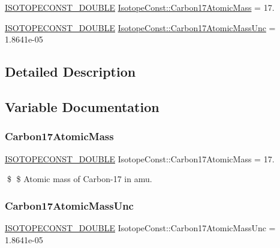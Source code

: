 \begin{DoxyCompactItemize}
\item 
\mbox{\hyperlink{group___isotope_const-_macros_ga8f45a7272ce02c0b4c65c44636ed719a}{I\+S\+O\+T\+O\+P\+E\+C\+O\+N\+S\+T\+\_\+\+D\+O\+U\+B\+LE}} \mbox{\hyperlink{group___isotope_const-_carbon-_c17_gaf0cf934a262b77a6bdb2248e5fcdf174}{Isotope\+Const\+::\+Carbon17\+Atomic\+Mass}} = 17.
\item 
\mbox{\hyperlink{group___isotope_const-_macros_ga8f45a7272ce02c0b4c65c44636ed719a}{I\+S\+O\+T\+O\+P\+E\+C\+O\+N\+S\+T\+\_\+\+D\+O\+U\+B\+LE}} \mbox{\hyperlink{group___isotope_const-_carbon-_c17_gaeeb079804aac22d10930760a47136063}{Isotope\+Const\+::\+Carbon17\+Atomic\+Mass\+Unc}} = 1.\+8641e-\/05
\end{DoxyCompactItemize}


\subsection{Detailed Description}


\subsection{Variable Documentation}
\mbox{\label{group___isotope_const-_carbon-_c17_gaf0cf934a262b77a6bdb2248e5fcdf174}} 
\subsubsection{\texorpdfstring{Carbon17\+Atomic\+Mass}{Carbon17AtomicMass}}
{\footnotesize\ttfamily \mbox{\hyperlink{group___isotope_const-_macros_ga8f45a7272ce02c0b4c65c44636ed719a}{I\+S\+O\+T\+O\+P\+E\+C\+O\+N\+S\+T\+\_\+\+D\+O\+U\+B\+LE}} Isotope\+Const\+::\+Carbon17\+Atomic\+Mass = 17.}

\$ \$ Atomic mass of Carbon-\/17 in amu. \mbox{\label{group___isotope_const-_carbon-_c17_gaeeb079804aac22d10930760a47136063}} 
\subsubsection{\texorpdfstring{Carbon17\+Atomic\+Mass\+Unc}{Carbon17AtomicMassUnc}}
{\footnotesize\ttfamily \mbox{\hyperlink{group___isotope_const-_macros_ga8f45a7272ce02c0b4c65c44636ed719a}{I\+S\+O\+T\+O\+P\+E\+C\+O\+N\+S\+T\+\_\+\+D\+O\+U\+B\+LE}} Isotope\+Const\+::\+Carbon17\+Atomic\+Mass\+Unc = 1.\+8641e-\/05}

